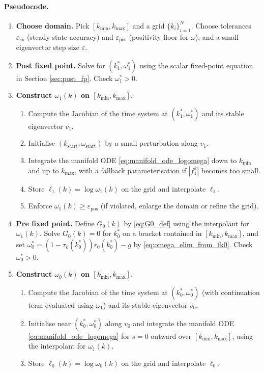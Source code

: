 \documentclass{article}
\begin{document}
\paragraph{Pseudocode.}
\begin{enumerate}
\item \textbf{Choose domain.} Pick $[k_{\min},k_{\max}]$ and a grid $\{k_i\}_{i=1}^N$.
Choose tolerances $\varepsilon_{ss}$ (steady-state accuracy) and $\varepsilon_{\mathrm{pos}}$
(positivity floor for $\omega$), and a small eigenvector step size $\varepsilon$.

\item \textbf{Post fixed point.} Solve for $(k_1^\ast,\omega_1^\ast)$ using the scalar fixed-point
equation in Section \ref{sec:post_fp}. Check $\omega_1^\ast>0$.

\item \textbf{Construct $\omega_1(k)$ on $[k_{\min},k_{\max}]$.}
\begin{enumerate}
\item Compute the Jacobian of the time system at $(k_1^\ast,\omega_1^\ast)$ and its stable eigenvector $v_1$.
\item Initialise $(k_{\mathrm{start}},\omega_{\mathrm{start}})$ by a small perturbation along $v_1$.
\item Integrate the manifold ODE \eqref{eq:manifold_ode_logomega} down to $k_{\min}$ and up to $k_{\max}$,
with a fallback parameterisation if $|f^k_1|$ becomes too small.
\item Store $\ell_1(k)=\log\omega_1(k)$ on the grid and interpolate $\ell_1$.
\item Enforce $\omega_1(k)\ge \varepsilon_{\mathrm{pos}}$ (if violated, enlarge the domain or refine the grid).
\end{enumerate}

\item \textbf{Pre fixed point.} Define $G_0(k)$ by \eqref{eq:G0_def} using the interpolant for $\omega_1(k)$.
Solve $G_0(k)=0$ for $k_0^\ast$ on a bracket contained in $[k_{\min},k_{\max}]$, and set
$\omega_0^\ast=(1-\tau_k(k_0^\ast))r_0(k_0^\ast)-g$ by \eqref{eq:omega_elim_from_fk0}.
Check $\omega_0^\ast>0$.

\item \textbf{Construct $\omega_0(k)$ on $[k_{\min},k_{\max}]$.}
\begin{enumerate}
\item Compute the Jacobian of the time system at $(k_0^\ast,\omega_0^\ast)$ (with continuation term evaluated using $\omega_1$)
and its stable eigenvector $v_0$.
\item Initialise near $(k_0^\ast,\omega_0^\ast)$ along $v_0$ and integrate the manifold ODE
\eqref{eq:manifold_ode_logomega} for $s=0$ outward over $[k_{\min},k_{\max}]$, using the interpolant for $\omega_1(k)$.
\item Store $\ell_0(k)=\log\omega_0(k)$ on the grid and interpolate $\ell_0$.
\end{enumerate}


\end{enumerate}
\end{document}
